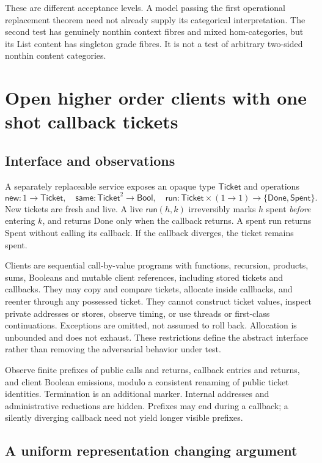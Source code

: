 \documentclass[11pt,a4paper]{article}
\begin{document}
These are different acceptance levels. A model passing the first operational
replacement theorem need not already supply its categorical interpretation.
The second test has genuinely nonthin context fibres and mixed hom-categories,
but its List content has singleton grade fibres. It is not a test of arbitrary
two-sided nonthin content categories.

\section{Open higher order clients with one shot callback tickets}

\subsection{Interface and observations}

A separately replaceable service exposes an opaque type \(\mathsf{Ticket}\)
and operations
\[
 \mathsf{new}:1\to\mathsf{Ticket},\quad
 \mathsf{same}:\mathsf{Ticket}^2\to\mathsf{Bool},\quad
 \mathsf{run}:\mathsf{Ticket}\times(1\to1)
       \to\{\mathsf{Done},\mathsf{Spent}\}.
\]
New tickets are fresh and live. A live \(\mathsf{run}(h,k)\) irreversibly
marks \(h\) spent \emph{before} entering \(k\), and returns Done only when
the callback returns. A spent run returns Spent without calling its callback.
If the callback diverges, the ticket remains spent.

Clients are sequential call-by-value programs with functions, recursion,
products, sums, Booleans and mutable client references, including stored tickets
and callbacks. They may copy and compare tickets, allocate inside callbacks,
and reenter through any possessed ticket. They cannot construct ticket values,
inspect private addresses or stores, observe timing, or use threads or
first-class continuations. Exceptions are omitted, not assumed to roll back.
Allocation is unbounded and does not exhaust. These restrictions define the
abstract interface rather than removing the adversarial behavior under test.

Observe finite prefixes of public calls and returns, callback entries and
returns, and client Boolean emissions, modulo a consistent renaming of public
ticket identities. Termination is an additional marker. Internal addresses and
administrative reductions are hidden. Prefixes may end during a callback; a
silently diverging callback need not yield longer visible prefixes.

\subsection{A uniform representation changing argument}
\end{document}
